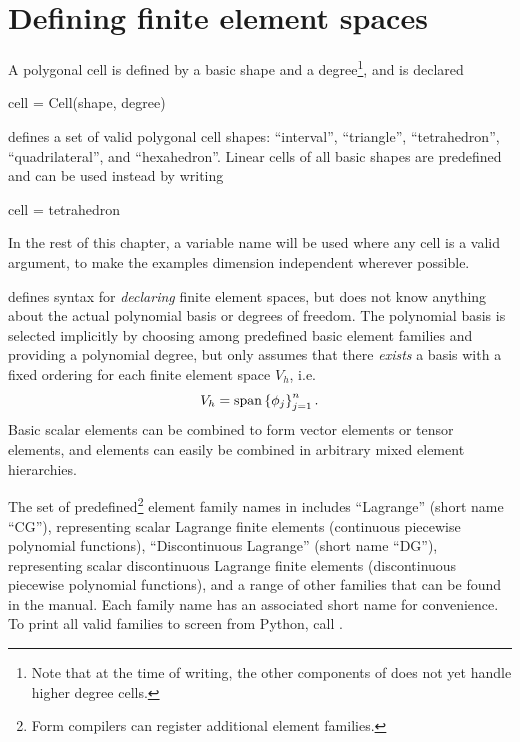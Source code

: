 \section{Defining finite element spaces} \label{ufl:sec:elements}
A polygonal cell is defined by a basic shape and a
degree\footnote{Note that at the time of writing, the other components
of \fenics{} does not yet handle higher degree cells.}, and is
declared
\begin{code}
cell = Cell(shape, degree)
\end{code}
\ufl{} defines a set of valid polygonal cell shapes:
``interval'', ``triangle'', ``tetrahedron'', ``quadrilateral'', and ``hexahedron''.
Linear cells of all basic shapes are predefined and can be used instead by writing
\begin{code}
cell = tetrahedron
\end{code}
In the rest of this chapter, a variable name  will be used
where any cell is a valid argument, to make the examples dimension
independent wherever possible.

\ufl{} defines syntax for \emph{declaring} finite element spaces, but
does not know anything about the actual polynomial basis or degrees of
freedom. The polynomial basis is selected implicitly by choosing among
predefined basic element families and providing a polynomial degree,
but \ufl{} only assumes that there \emph{exists} a basis with a fixed
ordering for each finite element space $V_h$, i.e.
\begin{align}
V_h = \operatorname{span}\left\{ \phi_j \right\}_{j=1}^{n}.
\end{align}
Basic scalar elements can be combined to form vector elements or
tensor elements, and elements can easily be combined in arbitrary
mixed element hierarchies.

The set of predefined\footnote{Form compilers can register additional
  element families.}  element family names in \ufl{} includes
``Lagrange'' (short name ``CG''), representing scalar Lagrange finite
elements (continuous piecewise polynomial functions), ``Discontinuous
Lagrange'' (short name ``DG''), representing scalar discontinuous
Lagrange finite elements (discontinuous piecewise polynomial
functions), and a range of other families that can be found in the
manual.  Each family name has an associated short name for
convenience.  To print all valid families to screen from Python, call
.

